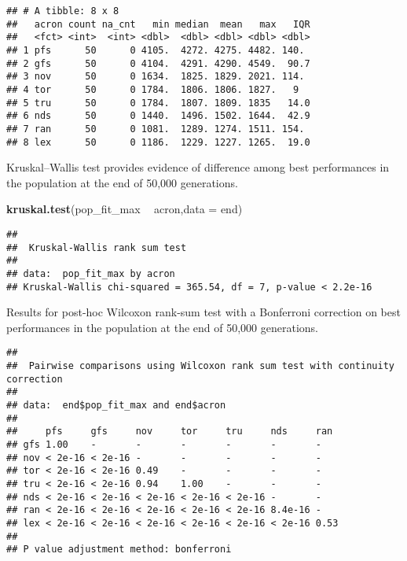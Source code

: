 \documentclass[]{book}
\newenvironment{Shaded}{\begin{snugshade}}{\end{snugshade}}
\newcommand{\DataTypeTok}[1]{\textcolor[rgb]{0.13,0.29,0.53}{#1}}
\newcommand{\KeywordTok}[1]{\textcolor[rgb]{0.13,0.29,0.53}{\textbf{#1}}}
\newcommand{\NormalTok}[1]{#1}
\newcommand{\OperatorTok}[1]{\textcolor[rgb]{0.81,0.36,0.00}{\textbf{#1}}}
\newcommand{\OtherTok}[1]{\textcolor[rgb]{0.56,0.35,0.01}{#1}}
\newcommand{\StringTok}[1]{\textcolor[rgb]{0.31,0.60,0.02}{#1}}
\begin{document}
\begin{verbatim}
## # A tibble: 8 x 8
##   acron count na_cnt   min median  mean   max   IQR
##   <fct> <int>  <int> <dbl>  <dbl> <dbl> <dbl> <dbl>
## 1 pfs      50      0 4105.  4272. 4275. 4482. 140. 
## 2 gfs      50      0 4104.  4291. 4290. 4549.  90.7
## 3 nov      50      0 1634.  1825. 1829. 2021. 114. 
## 4 tor      50      0 1784.  1806. 1806. 1827.   9  
## 5 tru      50      0 1784.  1807. 1809. 1835   14.0
## 6 nds      50      0 1440.  1496. 1502. 1644.  42.9
## 7 ran      50      0 1081.  1289. 1274. 1511. 154. 
## 8 lex      50      0 1186.  1229. 1227. 1265.  19.0
\end{verbatim}

Kruskal--Wallis test provides evidence of difference among best performances in the population at the end of 50,000 generations.

\begin{Shaded}
\begin{Highlighting}[]
\KeywordTok{kruskal.test}\NormalTok{(pop_fit_max }\OperatorTok{~}\StringTok{ }\NormalTok{acron,}\DataTypeTok{data =}\NormalTok{ end)}
\end{Highlighting}
\end{Shaded}

\begin{verbatim}
## 
##  Kruskal-Wallis rank sum test
## 
## data:  pop_fit_max by acron
## Kruskal-Wallis chi-squared = 365.54, df = 7, p-value < 2.2e-16
\end{verbatim}

Results for post-hoc Wilcoxon rank-sum test with a Bonferroni correction on best performances in the population at the end of 50,000 generations.

\begin{Shaded}
\end{Shaded}

\begin{verbatim}
## 
##  Pairwise comparisons using Wilcoxon rank sum test with continuity correction 
## 
## data:  end$pop_fit_max and end$acron 
## 
##     pfs     gfs     nov     tor     tru     nds     ran 
## gfs 1.00    -       -       -       -       -       -   
## nov < 2e-16 < 2e-16 -       -       -       -       -   
## tor < 2e-16 < 2e-16 0.49    -       -       -       -   
## tru < 2e-16 < 2e-16 0.94    1.00    -       -       -   
## nds < 2e-16 < 2e-16 < 2e-16 < 2e-16 < 2e-16 -       -   
## ran < 2e-16 < 2e-16 < 2e-16 < 2e-16 < 2e-16 8.4e-16 -   
## lex < 2e-16 < 2e-16 < 2e-16 < 2e-16 < 2e-16 < 2e-16 0.53
## 
## P value adjustment method: bonferroni
\end{verbatim}
\end{document}
